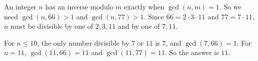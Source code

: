 An integer $n$ has an inverse modulo $m$ exactly when $\gcd(n,m)=1$. So we need $\gcd(n,66)>1$ and $\gcd(n,77)>1$. Since $66=2\cdot3\cdot11$ and $77=7\cdot11$, $n$ must be divisible by one of $2,3,11$ and by one of $7,11$.

For $n\le10$, the only number divisible by $7$ or $11$ is $7$, and $\gcd(7,66)=1$. For $n=11$, $\gcd(11,66)=11$ and $\gcd(11,77)=11$. So the answer is $\boxed{11}$.
